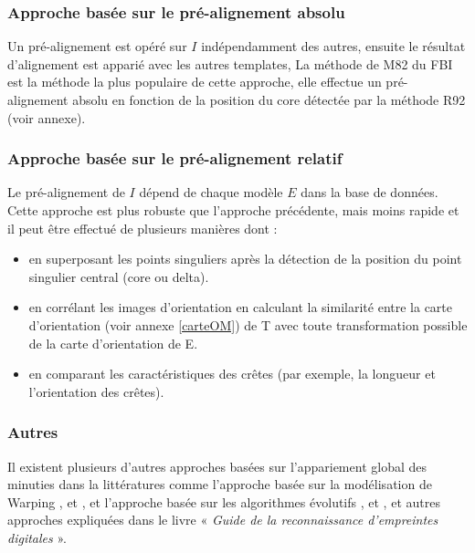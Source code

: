 \subsubsection{Approche basée sur le pré-alignement absolu}
Un pré-alignement est opéré sur $ I $ indépendamment des autres, ensuite le résultat d’alignement est apparié avec les autres templates, La méthode de M82 du FBI est la méthode la plus populaire de cette approche, elle effectue un pré-alignement absolu en fonction de la position du core détectée par la méthode R92 (voir annexe).

\subsubsection{Approche basée sur le pré-alignement relatif}
Le pré-alignement de $ I $ dépend de chaque modèle $ E $ dans la base de données. Cette approche est plus robuste que l’approche précédente, mais moins rapide et il peut être effectué de plusieurs manières dont :
\begin{itemize}
	\item en superposant les points singuliers après la détection de la position du point singulier central (core ou delta).
	\item en corrélant les images d'orientation en calculant la similarité entre la carte d’orientation (voir annexe \ref{carteOM}) de T avec toute transformation possible de la carte d'orientation de E.
	\item en comparant les caractéristiques des crêtes (par exemple, la longueur et l'orientation des crêtes).
\end{itemize}
\subsubsection{Autres}
Il existent plusieurs d'autres approches basées sur l'appariement global des minuties dans la littératures comme l'approche basée sur la modélisation de Warping \citep{meenen2006utilization}, \citep{liang2006fingerprint} et \citep{shi2009minucode} , et l'approche basée sur les algorithmes évolutifs \citep{sheng2009consensus}, \citep{sheng2007memetic} et \citep{tan2006fingerprint}, et autres approches expliquées dans le livre « \textit{Guide de la reconnaissance d'empreintes digitales} \citep{maltoni2009handbook}».

